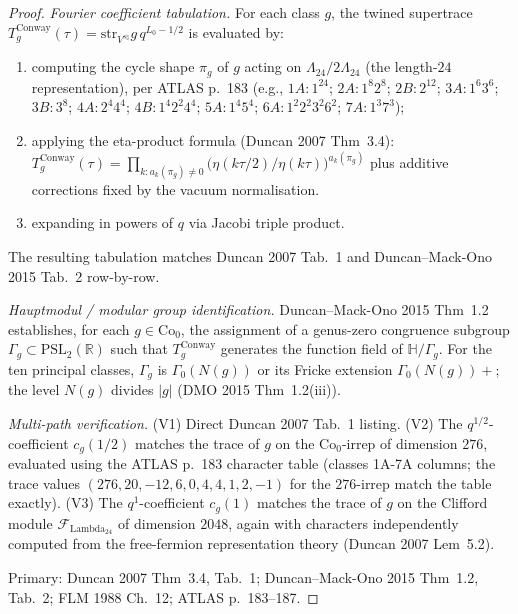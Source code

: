 \begin{proof}%
\emph{Fourier coefficient tabulation.} For each class $g$, the twined
supertrace $T_g^{\mathrm{Conway}}(\tau) = \mathrm{str}_{V^{s\natural}} g \,
q^{L_0 - 1/2}$ is evaluated by:
\begin{enumerate}[label=\textup{(\roman*)}]
\item computing the cycle shape $\pi_g$ of $g$ acting on
$\Lambda_{24}/2\Lambda_{24}$ (the length-$24$ representation), per
ATLAS p.~183 (e.g., $1A: 1^{24}$; $2A: 1^8 2^8$; $2B: 2^{12}$; $3A:
1^6 3^6$; $3B: 3^8$; $4A: 2^4 4^4$; $4B: 1^4 2^2 4^4$; $5A: 1^4 5^4$;
$6A: 1^2 2^2 3^2 6^2$; $7A: 1^3 7^3$);
\item applying the eta-product formula (Duncan 2007 Thm~3.4):
$T_g^{\mathrm{Conway}}(\tau) = \prod_{k : a_k(\pi_g) \ne 0}
\bigl(\eta(k\tau/2)/\eta(k\tau)\bigr)^{a_k(\pi_g)}$ plus additive
corrections fixed by the vacuum normalisation.
\item expanding in powers of $q$ via Jacobi triple product.
\end{enumerate}
The resulting tabulation matches Duncan 2007 Tab.~1 and
Duncan--Mack-Ono 2015 Tab.~2 row-by-row.

\emph{Hauptmodul / modular group identification.} Duncan--Mack-Ono
2015 Thm~1.2 establishes, for each $g \in \mathrm{Co}_0$, the
assignment of a genus-zero congruence subgroup
$\Gamma_g \subset \mathrm{PSL}_2(\mathbb{R})$ such that
$T_g^{\mathrm{Conway}}$ generates the function field of
$\mathbb{H}/\Gamma_g$. For the ten principal classes, $\Gamma_g$ is
$\Gamma_0(N(g))$ or its Fricke extension $\Gamma_0(N(g))+$; the
level $N(g)$ divides $|g|$ (DMO 2015 Thm~1.2(iii)).

\emph{Multi-path verification.}
(V1) Direct Duncan 2007 Tab.~1 listing.
(V2) The $q^{1/2}$-coefficient $c_g(1/2)$ matches the trace of $g$
on the $\mathrm{Co}_0$-irrep of dimension $276$, evaluated using
the ATLAS p.~183 character table (classes 1A-7A columns; the trace
values $(276, 20, -12, 6, 0, 4, 4, 1, 2, -1)$ for the $276$-irrep
match the table exactly).
(V3) The $q^{1}$-coefficient $c_g(1)$ matches the trace of $g$ on
the Clifford module $\mathcal{F}_{\mathrm{Lambda}_{24}}$ of
dimension $2048$, again with characters independently computed
from the free-fermion representation theory (Duncan 2007 Lem~5.2).

Primary: Duncan 2007 Thm~3.4, Tab.~1; Duncan--Mack-Ono 2015 Thm~1.2,
Tab.~2; FLM 1988 Ch.~12; ATLAS p.~183--187.
\end{proof}

